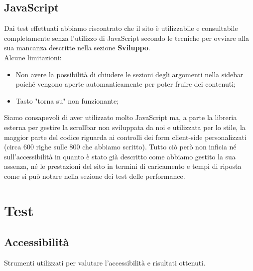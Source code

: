 \documentclass[12pt]{article}
\begin{document}
	\subsection{JavaScript}
	Dai test effettuati abbiamo riscontrato che il sito è utilizzabile e consultabile completamente senza l'utilizzo di JavaScript secondo le tecniche per ovviare alla sua mancanza descritte nella sezione \textbf{Sviluppo}. \\
	Alcune limitazioni:
	\begin{itemize}
		\item Non avere la possibilità di chiudere le sezioni degli argomenti nella sidebar poiché vengono aperte automanticamente per poter fruire dei contenuti;
		\item Tasto "torna su" non funzionante;
	\end{itemize}
	Siamo consapevoli di aver utilizzato molto JavaScript ma, a parte la libreria esterna per gestire la scrollbar non sviluppata da noi e utilizzata per lo stile, la maggior parte del codice riguarda ai controlli dei form client-side personalizzati (circa 600 righe sulle 800 che abbiamo scritto).
	Tutto ciò però non inficia né sull'accessibilità in quanto è stato già descritto come abbiamo gestito la sua assenza, né le prestazioni del sito in termini di caricamento e tempi di riposta come si può notare nella sezione dei test delle performance.
	
	\section{Test}
	\subsection{Accessibilità}
	Strumenti utilizzati per valutare l'accessibilità e risultati ottenuti.
\end{document}
